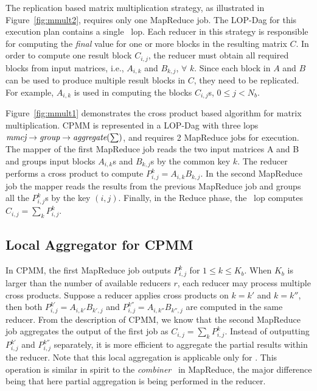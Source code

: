 { The replication based matrix multiplication strategy, as illustrated in Figure~\ref{fig:mmult2}, requires only one MapReduce job. The LOP-Dag for this execution plan contains a single \rmmloptext\ lop. 
Each reducer in this strategy is responsible for computing the {\em final} value for one or more blocks in the resulting matrix $C$. In order to compute one result block $C_{i,j}$, the reducer must obtain all required blocks from input matrices, i.e., $A_{i,k}$ and $B_{k,j}$, $\forall$ $k$. Since each block in $A$ and $B$ can be used to produce multiple result blocks in $C$, they need to be replicated. For example, $A_{i,k}$ is used in computing the blocks $C_{i,j}$s, $0 \leq j < N_b$. 


{} Figure~\ref{fig:mmult1}
demonstrates the cross product based algorithm for matrix
multiplication. CPMM is represented in a LOP-Dag with three
lops $\textit{mmcj} \rightarrow \textit{group} \rightarrow \textit{aggregate}(\sum)$, and requires 2
MapReduce jobs for execution.
The mapper of the first MapReduce job
reads the two input matrices A and B and groups input blocks $A_{i,k}$s 
and $B_{k,j}$s by the common key $k$. The reducer performs a cross product to compute $P^k_{i,j}=A_{i,k}B_{k,j}$. In the second MapReduce
job the mapper reads the results from the previous MapReduce job
and groups all
the $P^k_{i,j}$s by the key $(i,j)$. Finally, in the Reduce phase,
the \aggloptext\ lop computes $C_{i,j}=\sum_k{P^k_{i,j}}$.

\subsection{Local Aggregator for CPMM}\label{sec:localagg}
In CPMM, the first MapReduce job outputs $P^k_{i,j}$ for $1 \leq k \leq
K_b$. When $K_b$ is larger than the number of available reducers $r$,
each reducer may process multiple cross products. Suppose a reducer applies cross products
on $k = k'$ and $k = k''$, then both $P^{k'}_{i,j}=A_{i,k'}B_{k',j}$ and $P^{k''}_{i,j}=A_{i,k''}B_{k'',j}$ are computed
in the same reducer. From the description of CPMM, we know that 
the second MapReduce job aggregates the output of the first job as
$C_{i,j}=\sum_k{P^k_{i,j}}$. 
Instead of outputting $P^{k'}_{i,j}$ and
$P^{k''}_{i,j}$ separately, it is more efficient to
aggregate the partial results within the reducer. Note that this
local aggregation is applicable only for \mmcjlop.
This operation is similar in
spirit to the \textit{combiner}~\cite{mapreduce} in MapReduce,
the major difference being that here partial
aggregation is being performed in the reducer.

}

